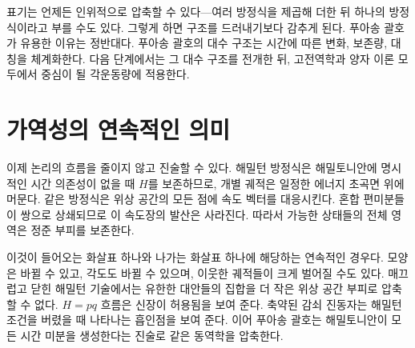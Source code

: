 표기는 언제든 인위적으로 압축할 수 있다---여러 방정식을 제곱해 더한 뒤 하나의 방정식이라고 부를 수도 있다. 그렇게 하면 구조를 드러내기보다 감추게 된다. 푸아송 괄호가 유용한 이유는 정반대다. 푸아송 괄호의 대수 구조는 시간에 따른 변화, 보존량, 대칭을 체계화한다. 다음 단계에서는 그 대수 구조를 전개한 뒤, 고전역학과 양자 이론 모두에서 중심이 될 각운동량에 적용한다.

\section{가역성의 연속적인 의미}

이제 논리의 흐름을 줄이지 않고 진술할 수 있다. 해밀턴 방정식은 해밀토니안에 명시적인 시간 의존성이 없을 때 \(H\)를 보존하므로, 개별 궤적은 일정한 에너지 초곡면 위에 머문다. 같은 방정식은 위상 공간의 모든 점에 속도 벡터를 대응시킨다. 혼합 편미분들이 쌍으로 상쇄되므로 이 속도장의 발산은 사라진다. 따라서 가능한 상태들의 전체 영역은 정준 부피를 보존한다.

이것이 들어오는 화살표 하나와 나가는 화살표 하나에 해당하는 연속적인 경우다. 모양은 바뀔 수 있고, 각도도 바뀔 수 있으며, 이웃한 궤적들이 크게 벌어질 수도 있다. 매끄럽고 닫힌 해밀턴 기술에서는 유한한 대안들의 집합을 더 작은 위상 공간 부피로 압축할 수 없다. \(H=pq\) 흐름은 신장이 허용됨을 보여 준다. 축약된 감쇠 진동자는 해밀턴 조건을 버렸을 때 나타나는 흡인점을 보여 준다. 이어 푸아송 괄호는 해밀토니안이 모든 시간 미분을 생성한다는 진술로 같은 동역학을 압축한다.
